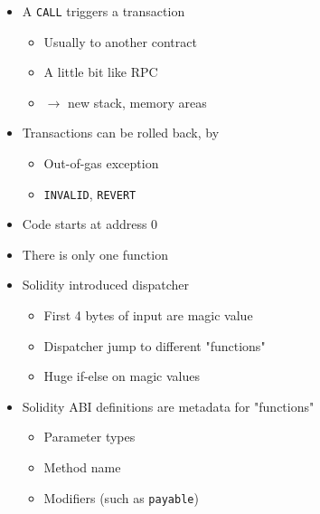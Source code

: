 \begin{frame}
  \begin{itemize}
    \item A \texttt{CALL} triggers a transaction
      \begin{itemize}
        \item Usually to another contract
        \item A little bit like RPC
        \item $\rightarrow$ new stack, memory areas
      \end{itemize}
    \item Transactions can be rolled back, by
      \begin{itemize}
        \item Out-of-gas exception
        \item \texttt{INVALID}, \texttt{REVERT}
      \end{itemize}
  \end{itemize}

\framebreak

  \begin{itemize}
    \item Code starts at address $0$
    \item There is only one function
    \item Solidity introduced dispatcher
      \begin{itemize}
        \item First 4 bytes of input are magic value
        \item Dispatcher jump to different "functions"
        \item Huge if-else on magic values
      \end{itemize}
    \item Solidity ABI definitions are metadata for "functions"
      \begin{itemize}
        \item Parameter types
        \item Method name
        \item Modifiers (such as \texttt{payable})
      \end{itemize}

  \end{itemize}


\end{frame}

